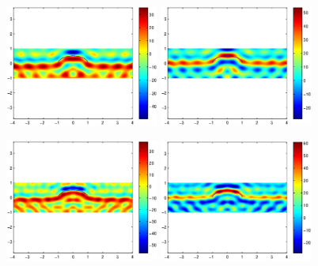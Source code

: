 \documentclass[12pt]{iopart}
\begin{document}
\begin{figure}
	\centering
	\includegraphics[width=0.45\textwidth]{./figure_rough/hemicircle_1point5}
	\includegraphics[width=0.45\textwidth]{./figure_rough/hemicircle_1point5_real}
	\caption{}\label{I1}
\end{figure}
\begin{figure}
	\centering
	\includegraphics[width=0.45\textwidth]{./figure_rough/hemicircle_2}
	\includegraphics[width=0.45\textwidth]{./figure_rough/hemicircle_2_real}
	\caption{}\label{I1}
\end{figure}
\end{document}
